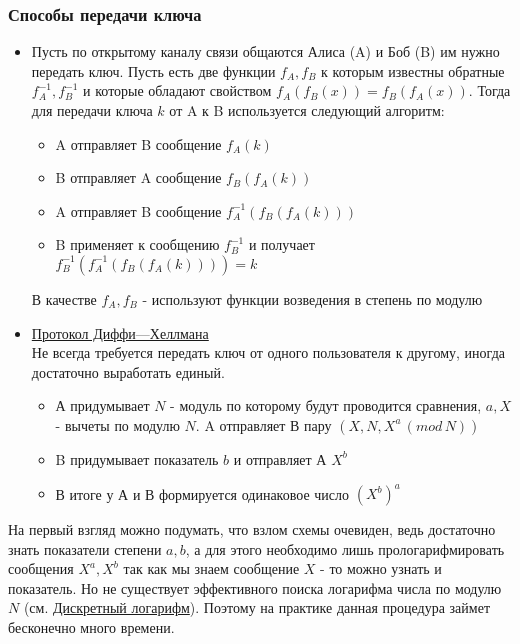 \subsubsection{Способы передачи ключа}

\begin {itemize}
\item Пусть по открытому каналу связи общаются Алиса (A) и Боб (B) им нужно передать ключ. Пусть есть две функции $f_{A}, f_{B}$ к которым известны обратные $f^{-1}_{A}, f^{-1}_{B}$ и которые обладают свойством $f_{A} (f_{B} (x)) = f_{B} (f_{A} (x))$. Тогда для передачи ключа $k$ от A к B используется следующий алгоритм:
\begin {itemize}
\item A отправляет B сообщение $f_{A} (k)$ 
\item B отправляет A сообщение $f_{B}(f_{A} (k))$
\item A отправляет B сообщение $f^{-1}_{A}(f_{B}(f_{A} (k)))$
\item B применяет к сообщению $f^{-1}_{B}$ и получает $f^{-1}_{B}(f^{-1}_{A}(f_{B}(f_{A} (k)))) = k$
\end {itemize}
В качестве $f_{A}, f_{B}$ - используют функции возведения в степень по модулю \\

\item \href{https://clck.ru/9rNPo} {Протокол Диффи—Хеллмана}\\
Не всегда требуется передать ключ от одного пользователя к другому, иногда достаточно выработать единый. 
\begin {itemize}
\item А придумывает $N$ - модуль по которому будут проводится сравнения, $a, X$ - вычеты по модулю $N$. A отправляет В пару $(X, N, X^{a} \, (mod \, N))$
\item B придумывает показатель $b$ и отправляет А $X^{b}$
\item В итоге у А и В формируется одинаковое число $\left( X^{b} \right)^{a}$
\end {itemize}
\end{itemize}
На первый взгляд можно подумать, что взлом схемы очевиден, ведь достаточно знать показатели степени $a, b$, а для этого необходимо лишь прологарифмировать сообщения $X^a, X^b$ так как мы знаем сообщение $X$ - то можно узнать и показатель. Но не существует эффективного поиска логарифма числа по модулю $N$ (см. \href{https://clck.ru/pv4S6}{Дискретный логарифм}). Поэтому на практике данная процедура займет бесконечно много времени.

